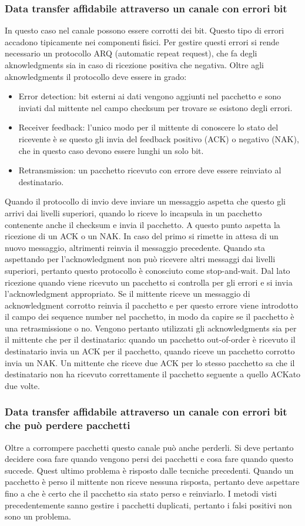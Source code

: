\subsubsection{Data transfer affidabile attraverso un canale con errori bit}
In questo caso nel canale possono essere corrotti dei bit. Questo tipo di errori accadono tipicamente nei componenti fisici. Per gestire questi errori 
si rende necessario un protocollo ARQ (automatic repeat request), che fa degli aknowledgments sia in caso di ricezione positiva che negativa. Oltre agli
aknowledgments il protocollo deve essere in grado:
\begin{itemize}
\item Error detection: bit esterni ai dati vengono aggiunti nel pacchetto e sono inviati dal mittente nel campo checksum per trovare se esistono degli 
errori.
\item Receiver feedback: l'unico modo per il mittente di conoscere lo stato del ricevente \`e se questo gli invia del feedback positivo (ACK) o negativo
(NAK), che in questo caso devono essere lunghi un solo bit. 
\item Retransmission: un pacchetto ricevuto con errore deve essere reinviato al destinatario. 
\end{itemize}
Quando il protocollo di invio deve inviare un messaggio aspetta che questo gli arrivi dai livelli superiori, quando lo riceve lo incapsula in un pacchetto
contenente anche il checksum e invia il pacchetto. A questo punto aspetta la ricezione di un ACK o un NAK. In caso del primo si rimette in attesa di un 
nuovo messaggio, altrimenti reinvia il messaggio precedente. Quando sta aspettando per l'acknowledgment non pu\`o ricevere altri messaggi dai livelli 
superiori, pertanto questo protocollo \`e conosciuto come stop-and-wait. Dal lato ricezione quando viene ricevuto un pacchetto si controlla per gli errori
e si invia l'acknowledgment appropriato. Se il mittente riceve un messaggio di acknowledgment corrotto reinvia il pacchetto e per questo errore viene 
introdotto il campo dei sequence number nel pacchetto, in modo da capire se il pacchetto \`e una retrasmissione o no. Vengono pertanto utilizzati gli 
acknowledgments sia per il mittente che per il destinatario: quando un pacchetto out-of-order \`e ricevuto il destinatario invia un ACK per il pacchetto, 
quando riceve un pacchetto corrotto invia un NAK. Un mittente che riceve due ACK per lo stesso pacchetto sa che il destinatario non ha ricevuto 
correttamente il pacchetto seguente a quello ACKato due volte. 
\subsubsection{Data transfer affidabile attraverso un canale con errori bit che pu\`o perdere pacchetti}
Oltre a corrompere pacchetti questo canale pu\`o anche perderli. Si deve pertanto decidere cosa fare quando vengono persi dei pacchetti e cosa fare quando
questo succede. Quest ultimo problema \`e risposto dalle tecniche precedenti. Quando un pacchetto \`e perso il mittente non riceve nessuna risposta, 
pertanto deve aspettare fino a che \`e certo che il pacchetto sia stato perso e reinviarlo. I metodi visti precedentemente sanno gestire i pacchetti 
duplicati, pertanto i falsi positivi non sono un problema.
